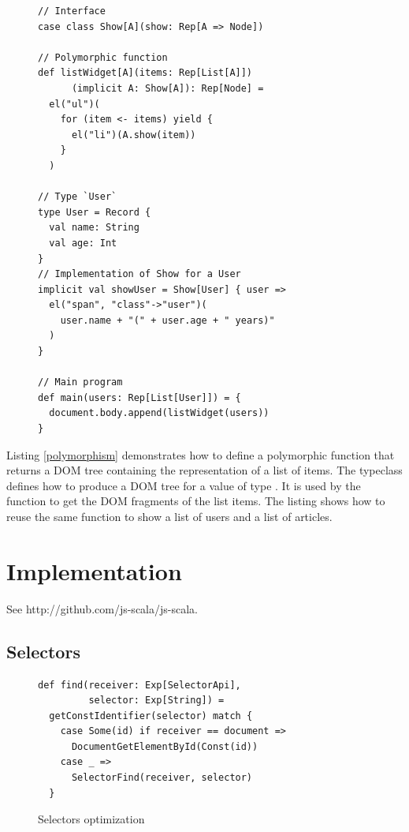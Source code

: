 \documentclass[preprint]{sigplanconf}
\begin{document}
\begin{figure}
\begin{lstlisting}[label=polymorphism,caption=Ad hoc polymorphism using typeclasses]
// Interface
case class Show[A](show: Rep[A => Node])

// Polymorphic function
def listWidget[A](items: Rep[List[A]])
      (implicit A: Show[A]): Rep[Node] =
  el("ul")(
    for (item <- items) yield {
      el("li")(A.show(item))
    }
  )

// Type `User`
type User = Record {
  val name: String
  val age: Int
}
// Implementation of Show for a User
implicit val showUser = Show[User] { user =>
  el("span", "class"->"user")(
    user.name + "(" + user.age + " years)"
  )
}

// Main program
def main(users: Rep[List[User]]) = {
  document.body.append(listWidget(users))
}
\end{lstlisting}
\end{figure}

Listing \ref{polymorphism} demonstrates how to define a polymorphic  function that returns a DOM
tree containing the representation of a list of items. The  typeclass defines how to produce a DOM tree
for a value of type . It is used by the  function to get the DOM fragments of the list
items. The listing shows how to reuse the same  function to show a list of users and a list of
articles.

\section{Implementation}
\label{implementation}

See http://github.com/js-scala/js-scala.

\subsection{Selectors}

\begin{figure}
\label{selector-impl}
\begin{lstlisting}
def find(receiver: Exp[SelectorApi],
         selector: Exp[String]) =
  getConstIdentifier(selector) match {
    case Some(id) if receiver == document =>
      DocumentGetElementById(Const(id))
    case _ =>
      SelectorFind(receiver, selector)
  }
\end{lstlisting}
\caption{Selectors optimization}
\end{figure}
\end{document}

